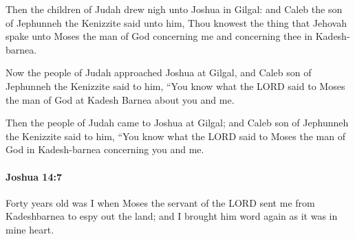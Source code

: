 			\begin{versebox}
					\item[BHS] 
					\item[ASV] Then the children of Judah drew nigh unto Joshua in Gilgal: and Caleb the son of Jephunneh the Kenizzite said unto him, Thou knowest the thing that Jehovah spake unto Moses the man of God concerning me and concerning thee in Kadesh-barnea.
					\item[NIV] Now the people of Judah approached Joshua at Gilgal, and Caleb son of Jephunneh the Kenizzite said to him, “You know what the LORD said to Moses the man of God at Kadesh Barnea about you and me.
					\item[NRSV] Then the people of Judah came to Joshua at Gilgal; and Caleb son of Jephunneh the Kenizzite said to him, “You know what the LORD said to Moses the man of God in Kadesh-barnea concerning you and me.
			\end{versebox}

		\paragraph{Joshua 14:7} %
			\label{JOSHUA-14-7}

			Forty years old was I when Moses the servant of the LORD sent me from Kadeshbarnea to espy out the land; and I brought him word again as it was in mine heart.


